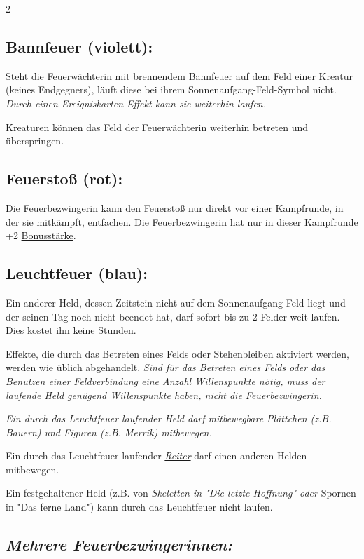 \documentclass[10pt, a4paper, oneside]{book}
\newcommand{\fan}[1]{\textit{#1}}
\begin{document}
\begin{multicols*}{2}
\begin{nobgcolor}
\subsection{Bannfeuer (violett):}

Steht die Feuerwächterin mit brennendem Bannfeuer auf dem Feld einer Kreatur (keines Endgegners), läuft diese bei ihrem Sonnenaufgang-Feld-Symbol nicht. \fan{Durch einen Ereigniskarten-Effekt kann sie weiterhin laufen.}

Kreaturen können das Feld der Feuerwächterin weiterhin betreten und überspringen.


\subsection{Feuerstoß (rot):}

Die Feuerbezwingerin kann den Feuerstoß nur direkt vor einer Kampfrunde, in der sie mitkämpft, entfachen. Die Feuerbezwingerin hat nur in dieser Kampfrunde +2 \hyperref[Bonusstärke]{Bonusstärke}.


\subsection{Leuchtfeuer (blau):}

Ein anderer Held, dessen Zeitstein nicht auf dem Sonnenaufgang-Feld liegt und der seinen Tag noch nicht beendet hat, darf sofort {bis zu} 2 Felder weit laufen. Dies kostet ihn keine Stunden.

Effekte, die durch das Betreten eines Felds oder Stehenbleiben aktiviert werden, werden wie üblich abgehandelt. \fan{Sind für das Betreten eines Felds oder das Benutzen einer Feldverbindung eine Anzahl Willenspunkte nötig, muss der laufende Held genügend Willenspunkte haben, nicht die Feuerbezwingerin.}

\fan{Ein durch das Leuchtfeuer laufender Held darf mitbewegbare Plättchen (z.B. Bauern) und Figuren (z.B. Merrik) mitbewegen.}

Ein durch das Leuchtfeuer laufender \hyperref[Reiter]{\fan{Reiter}} darf einen anderen Helden mitbewegen.
\supercite{127533}

Ein festgehaltener Held (z.B. von \fan{Skeletten in "Die letzte Hoffnung" oder} Spornen in "Das ferne Land") kann durch das Leuchtfeuer nicht laufen.
\supercite{DfL:Begleitheft,127533} 


\subsection{\fan{Mehrere Feuerbezwingerinnen:}}


\end{nobgcolor}
\end{multicols*}
\end{document}
